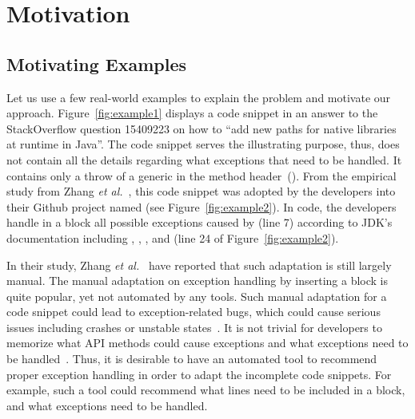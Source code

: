 \section{Motivation}
\label{motiv:sec}

\subsection{Motivating Examples}
\label{examples:sec}



Let us use a few real-world examples to explain the problem and
motivate our approach. Figure~\ref{fig:example1} displays a code
snippet in an answer to the StackOverflow question 15409223 on
how to ``add new paths for native libraries at runtime in Java''.  The
code snippet serves the illustrating purpose, thus, does not contain
all the details regarding what exceptions that need to be handled. It
contains only a throw of a generic  in the method
header~(). From the empirical study from Zhang
{\em et al.}~\cite{zhang-icse19}, this code snippet was adopted by the
developers into their Github project named  (see
Figure~\ref{fig:example2}). In  code, the developers
handle in a  block all possible exceptions caused
by  (line 7)
according to JDK's documentation including
, ,
, and
 (line 24 of
Figure~\ref{fig:example2}).

In their study, Zhang {\em et al.}~\cite{zhang-icse19} have reported
that such adaptation is still largely manual.
The manual adaptation on exception handling by inserting a
 block is quite popular, yet not automated by any
tools. Such manual adaptation for a code snippet could lead to
exception-related bugs, which could cause serious issues including
crashes or unstable states~\cite{xrank-fse20}. It is not trivial for
developers to memorize what API methods could cause exceptions and
what exceptions need to be handled~\cite{xrank-fse20}.
%
Thus, it is desirable to have an automated tool to recommend proper
exception handling in order to adapt the incomplete code snippets.
For example, such a tool could recommend what lines need to be
included in a  block, and what exceptions need to be
handled.


